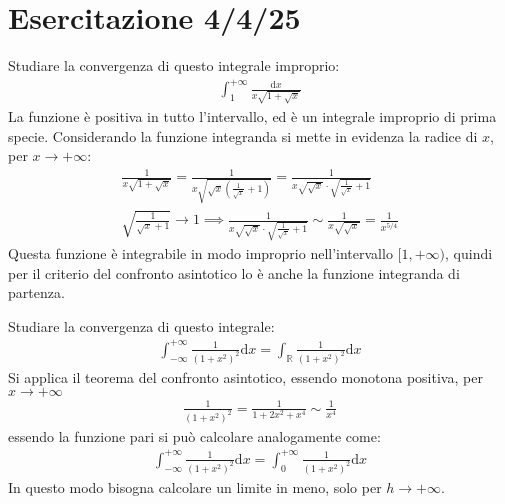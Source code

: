 \documentclass{article}
\newcommand{\df}{\mathrm{d}}
\newcommand{\intab}[4]{\displaystyle\int_{#1}^{#2}{#3}\df{#4}}
\newcommand{\intinf}[2]{\intab{-\infty}{+\infty}{#1}{#2}}
\newcommand{\intpinf}[2]{\intab{0}{+\infty}{#1}{#2}}
\numberwithin{equation}{subsection}
\begin{document}
\section{Esercitazione 4/4/25}

Studiare la convergenza di questo integrale improprio:
\begin{gather*}
    \displaystyle\int_1^{+\infty}\frac{\df x}{x\sqrt{1+\sqrt{x}}}
\end{gather*}
La funzione è positiva in tutto l'intervallo, ed è un integrale improprio di prima specie. Considerando la funzione integranda si mette in evidenza la radice di $x$, per $x\to+\infty$:
\begin{gather*}
    \displaystyle\frac{1}{x\sqrt{1+\sqrt{x}}}=\frac{1}{x\sqrt{\sqrt{x}\left(\frac{1}{\sqrt{x}}+1\right)}}=
    \frac{1}{x\sqrt{\sqrt{x}}\cdot\sqrt{\frac{1}{\sqrt{x}}+1}}\\
    \displaystyle\sqrt{\frac{1}{\sqrt{x}+1}}\to1\implies
    \frac{1}{x\sqrt{\sqrt{x}}\cdot\sqrt{\frac{1}{\sqrt{x}}+1}}\sim
    \frac{1}{x\sqrt{\sqrt{x}}}=\frac{1}{x^{5/4}}
\end{gather*}
Questa funzione è integrabile in modo improprio nell'intervallo $[1,+\infty)$, quindi per il criterio del confronto asintotico lo è anche la funzione integranda di partenza. 


Studiare la convergenza di questo integrale:
\begin{gather*}
    \intinf{\frac{1}{(1+x^2)^2}}{x}
    =\int_{\mathbb{R}}\frac{1}{(1+x^2)^2}\df x
\end{gather*}
Si applica il teorema del confronto asintotico, essendo monotona positiva, per $x\to+\infty$
\begin{gather*}
    \frac{1}{(1+x^2)^2}=
    \frac{1}{1+2x^2+x^4}\sim\frac{1}{x^4}
\end{gather*}
essendo la funzione pari si può calcolare analogamente come:
\begin{gather*}
    \intinf{\frac{1}{(1+x^2)^2}}{x}=
    \intpinf{\frac{1}{(1+x^2)^2}}{x}
\end{gather*}
In questo modo bisogna calcolare un limite in meno, solo per $h\to+\infty$. 
\end{document}
